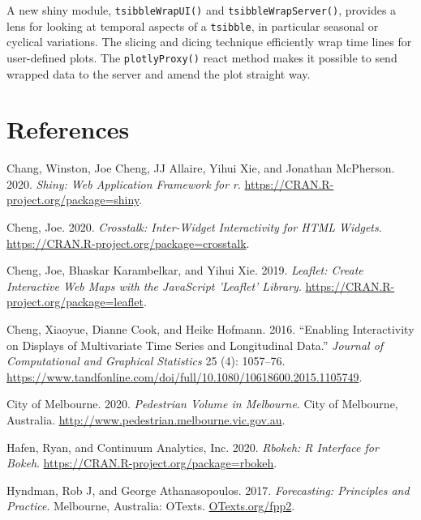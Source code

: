 A new shiny module, \texttt{tsibbleWrapUI()} and \texttt{tsibbleWrapServer()}, provides a lens for looking at temporal aspects of a \texttt{tsibble}, in particular seasonal or cyclical variations. The slicing and dicing technique efficiently wrap time lines for user-defined plots. The \texttt{plotlyProxy()} react method makes it possible to send wrapped data to the server and amend the plot straight way.

\hypertarget{references}{%
\section*{References}\label{references}}

\hypertarget{refs}{}
\begin{CSLReferences}{1}{0}
\leavevmode{}%
Chang, Winston, Joe Cheng, JJ Allaire, Yihui Xie, and Jonathan McPherson. 2020. \emph{Shiny: Web Application Framework for r}. \url{https://CRAN.R-project.org/package=shiny}.

\leavevmode{}%
Cheng, Joe. 2020. \emph{Crosstalk: Inter-Widget Interactivity for HTML Widgets}. \url{https://CRAN.R-project.org/package=crosstalk}.

\leavevmode{}%
Cheng, Joe, Bhaskar Karambelkar, and Yihui Xie. 2019. \emph{Leaflet: Create Interactive Web Maps with the JavaScript 'Leaflet' Library}. \url{https://CRAN.R-project.org/package=leaflet}.

\leavevmode{}%
Cheng, Xiaoyue, Dianne Cook, and Heike Hofmann. 2016. {``Enabling Interactivity on Displays of Multivariate Time Series and Longitudinal Data.''} \emph{Journal of Computational and Graphical Statistics} 25 (4): 1057--76. \url{https://www.tandfonline.com/doi/full/10.1080/10618600.2015.1105749}.

\leavevmode{}%
City of Melbourne. 2020. \emph{Pedestrian Volume in Melbourne}. City of Melbourne, Australia. \url{http://www.pedestrian.melbourne.vic.gov.au}.

\leavevmode{}%
Hafen, Ryan, and Continuum Analytics, Inc. 2020. \emph{Rbokeh: R Interface for Bokeh}. \url{https://CRAN.R-project.org/package=rbokeh}.

\leavevmode{}%
Hyndman, Rob J, and George Athanasopoulos. 2017. \emph{Forecasting: Principles and Practice}. Melbourne, Australia: OTexts. \href{https://OTexts.org/fpp2}{OTexts.org/fpp2}.


\end{CSLReferences}
